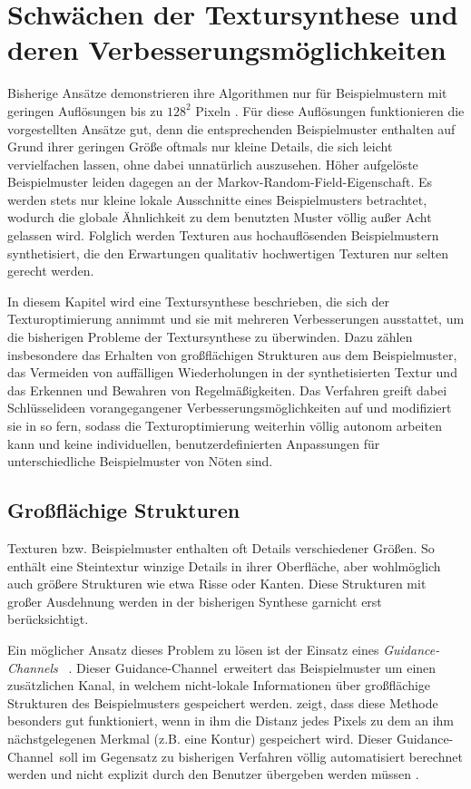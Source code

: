 \section{Schwächen der Textursynthese und deren Verbesserungsmöglichkeiten}

Bisherige Ansätze demonstrieren ihre Algorithmen nur für Beispielmustern mit geringen Auflösungen bis zu $128^2$ Pixeln \cite{SelfTuning}.
Für diese Auflösungen funktionieren die vorgestellten Ansätze gut, denn die entsprechenden Beispielmuster enthalten auf Grund ihrer geringen Größe oftmals nur kleine Details, die sich leicht vervielfachen lassen, ohne dabei unnatürlich auszusehen.
Höher aufgelöste Beispielmuster leiden dagegen an der \glqq Markov-Random-Field\grqq -Eigenschaft.
Es werden stets nur kleine lokale Ausschnitte eines Beispielmusters betrachtet, wodurch die globale Ähnlichkeit zu dem benutzten Muster völlig außer Acht gelassen wird.
Folglich werden Texturen aus hochauflösenden Beispielmustern synthetisiert, die den Erwartungen qualitativ hochwertigen Texturen nur selten gerecht werden.

In diesem Kapitel wird eine Textursynthese beschrieben, die sich der Texturoptimierung annimmt und sie mit mehreren Verbesserungen ausstattet, um die bisherigen Probleme der Textursynthese zu überwinden.
Dazu zählen insbesondere das Erhalten von großflächigen Strukturen aus dem Beispielmuster, das Vermeiden von auffälligen Wiederholungen in der synthetisierten Textur und das Erkennen und Bewahren von Regelmäßigkeiten.
Das Verfahren greift dabei Schlüsselideen vorangegangener Verbesserungsmöglichkeiten auf und modifiziert sie in so fern, sodass die Texturoptimierung weiterhin völlig autonom arbeiten kann und keine individuellen, benutzerdefinierten Anpassungen für unterschiedliche Beispielmuster von Nöten sind.

\subsection{Großflächige Strukturen}

Texturen bzw. Beispielmuster enthalten oft Details verschiedener Größen.
So enthält eine Steintextur winzige Details in ihrer Oberfläche, aber wohlmöglich auch größere Strukturen wie etwa Risse oder Kanten.
Diese Strukturen mit großer Ausdehnung werden in der bisherigen Synthese garnicht erst berücksichtigt.

Ein möglicher Ansatz dieses Problem zu lösen ist der Einsatz eines \emph{\glqq Guidance-Channels\grqq} \ \cite{SelfTuning}.
Dieser \glqq Guidance-Channel\grqq \ erweitert das Beispielmuster um einen zusätzlichen Kanal, in welchem nicht-lokale Informationen über großflächige Strukturen des Beispielmusters gespeichert werden.
\cite{Guidance} zeigt, dass diese Methode besonders gut funktioniert, wenn in ihm die Distanz jedes Pixels zu dem an ihm nächstgelegenen Merkmal (z.B. eine Kontur)  gespeichert wird.
Dieser \glqq Guidance-Channel\grqq \ soll im Gegensatz zu bisherigen Verfahren völlig automatisiert berechnet werden und nicht explizit durch den Benutzer übergeben werden müssen \cite{SelfTuning}.

